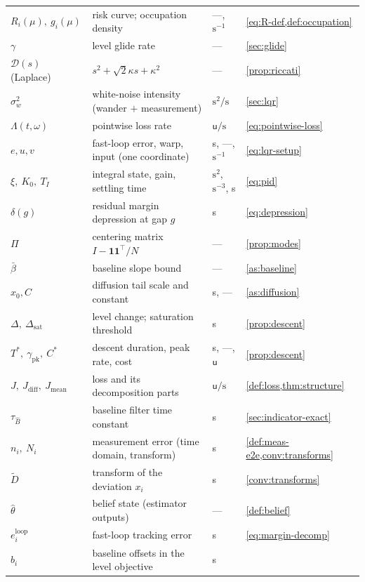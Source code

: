 \documentclass[11pt, a4paper]{article}
\theoremstyle{definition}
\theoremstyle{plain}
\theoremstyle{remark}
\begin{document}
\begin{table}[h!]
\begin{tabular}{@{}llll@{}}
$R_i(\mu),\ g_i(\mu)$ & risk curve; occupation density & ---,
  $\mathrm{s}^{-1}$ & \cref{eq:R-def,def:occupation} \\
$\gamma$ & level glide rate & --- & \cref{sec:glide} \\
$\mathcal{D}(s)$ (Laplace) & $s^2+\sqrt2\kappa s+\kappa^2$ & --- &
  \cref{prop:riccati} \\
$\sigma_w^2$ & white-noise intensity (wander $+$ measurement) &
  $\mathrm{s}^2/\mathrm{s}$ & \cref{sec:lqr} \\
$\Lambda(t,\omega)$ & pointwise loss rate & $\mathsf{u}/\mathrm{s}$ &
  \cref{eq:pointwise-loss} \\
$e, u, v$ & fast-loop error, warp, input (one coordinate) &
  s, ---, $\mathrm{s}^{-1}$ & \cref{eq:lqr-setup} \\
$\xi,\ K_0,\ T_I$ & integral state, gain, settling time &
  $\mathrm{s}^2$, $\mathrm{s}^{-3}$, s & \cref{eq:pid} \\
$\delta(g)$ & residual margin depression at gap $g$ & s &
  \cref{eq:depression} \\
$\Pi$ & centering matrix $I - \mathbf{1}\mathbf{1}^\top/N$ & --- &
  \cref{prop:modes} \\
$\bar\beta$ & baseline slope bound & --- & \cref{as:baseline} \\
$x_0, C$ & diffusion tail scale and constant & s, --- &
  \cref{as:diffusion} \\
$\Delta,\ \Delta_{\mathrm{sat}}$ & level change; saturation
  threshold & s & \cref{prop:descent} \\
$T^*,\ \gamma_{\mathrm{pk}},\ C^*$ & descent duration, peak rate,
  cost & s, ---, $\mathsf{u}$ & \cref{prop:descent} \\
$J,\ J_{\mathrm{diff}},\ J_{\mathrm{mean}}$ & loss and its
  decomposition parts & $\mathsf{u}/\mathrm{s}$ &
  \cref{def:loss,thm:structure} \\
$\tau_{\hat B}$ & baseline filter time constant & s &
  \cref{sec:indicator-exact} \\
$n_i,\ N_i$ & measurement error (time domain, transform) & s &
  \cref{def:meas-e2e,conv:transforms} \\
$\tilde D$ & transform of the deviation $x_i$ & s &
  \cref{conv:transforms} \\
$\hat\theta$ & belief state (estimator outputs) & --- &
  \cref{def:belief} \\
$e_i^{\mathrm{loop}}$ & fast-loop tracking error & s &
  \cref{eq:margin-decomp} \\
$b_i$ & baseline offsets in the level objective & s &

\end{tabular}
\end{table}
\end{document}
